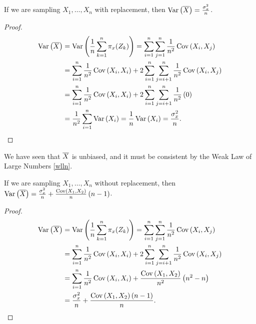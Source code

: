 \begin{prop}
    If we are sampling $X_1, \ldots, X_n$ with replacement, then $\operatorname{Var}\left(\overline{X}\right) = \frac{\sigma_x^2}{n}$.
\end{prop}

\begin{proof}
    \begin{align*}
        \operatorname{Var}\left(\overline{X}\right) &= \operatorname{Var}\left(\frac{1}{n}\sum_{k=1}^{n}\pi_{x}(Z_k)\right) = \sum_{i=1}^{n}\sum_{j=1}^{n}\frac{1}{n^2}\operatorname{Cov}\left(X_i, X_j\right) \\
        &= \sum_{i=1}^{n}\frac{1}{n^2}\operatorname{Cov}\left(X_i, X_i\right) + 2\sum_{i=1}^{n}\sum_{j=i+1}^{n}\frac{1}{n^2}\operatorname{Cov}\left(X_i, X_j\right) \\
        &= \sum_{i=1}^{n}\frac{1}{n^2}\operatorname{Cov}\left(X_i, X_i\right) + 2\sum_{i=1}^{n}\sum_{j=i+1}^{n}\frac{1}{n^2}\left(0\right) \\
        &= \frac{1}{n^2}\sum_{i=1}^{n}\operatorname{Var}\left(X_i\right) = \frac{1}{n}\operatorname{Var}\left(X_i\right) = \frac{\sigma_x^2}{n}.
    \end{align*}
\end{proof}

\begin{rmk}
    We have seen that $\overline{X}$ is unbiased, and it must be consistent by the Weak Law of Large Numbers \ref{wlln}.
\end{rmk}

\begin{prop}
    If we are sampling $X_1, \ldots, X_n$ without replacement, then $\operatorname{Var}\left(\overline{X}\right) = \frac{\sigma_x^2}{n} + \frac{\operatorname{Cov}\left(X_1, X_2\right)}{n}\left(n-1\right)$.
\end{prop}

\begin{proof}
    \begin{align*}
        \operatorname{Var}\left(\overline{X}\right) &= \operatorname{Var}\left(\frac{1}{n}\sum_{k=1}^{n}\pi_{x}(Z_k)\right) = \sum_{i=1}^{n}\sum_{j=1}^{n}\frac{1}{n^2}\operatorname{Cov}\left(X_i, X_j\right) \\
        &= \sum_{i=1}^{n}\frac{1}{n^2}\operatorname{Cov}\left(X_i, X_i\right) + 2\sum_{i=1}^{n}\sum_{j=i+1}^{n}\frac{1}{n^2}\operatorname{Cov}\left(X_i, X_j\right) \\
        &= \sum_{i=1}^{n}\frac{1}{n^2}\operatorname{Cov}\left(X_i, X_i\right) + \frac{\operatorname{Cov}\left(X_1, X_2\right)}{n^2}\left(n^2 - n\right) \\
        &= \frac{\sigma_x^2}{n} + \frac{\operatorname{Cov}\left(X_1, X_2\right)\left(n-1\right)}{n}.
    \end{align*}
\end{proof}


